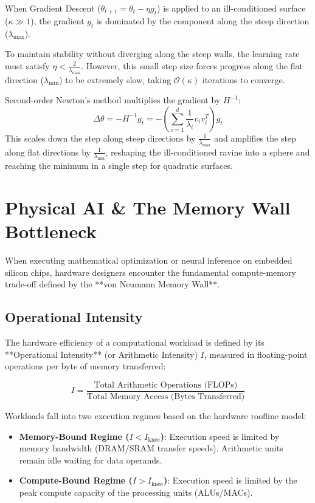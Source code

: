 \begin{mathbox}
When Gradient Descent ($\theta_{t+1} = \theta_t - \eta g_t$) is applied to an ill-conditioned surface ($\kappa \gg 1$), the gradient $g_t$ is dominated by the component along the steep direction ($\lambda_{\max}$). 

To maintain stability without diverging along the steep walls, the learning rate must satisfy $\eta < \frac{2}{\lambda_{\max}}$. However, this small step size forces progress along the flat direction ($\lambda_{\min}$) to be extremely slow, taking $\mathcal{O}(\kappa)$ iterations to converge.

Second-order Newton's method multiplies the gradient by $H^{-1}$:
$$\Delta \theta = -H^{-1} g_t = -\left( \sum_{i=1}^d \frac{1}{\lambda_i} v_i v_i^T \right) g_t$$
This scales down the step along steep directions by $\frac{1}{\lambda_{\max}}$ and amplifies the step along flat directions by $\frac{1}{\lambda_{\min}}$, reshaping the ill-conditioned ravine into a sphere and reaching the minimum in a single step for quadratic surfaces.
\end{mathbox}

\section{Physical AI \& The Memory Wall Bottleneck}
When executing mathematical optimization or neural inference on embedded silicon chips, hardware designers encounter the fundamental compute-memory trade-off defined by the **von Neumann Memory Wall**.

\subsection{Operational Intensity}
The hardware efficiency of a computational workload is defined by its **Operational Intensity** (or Arithmetic Intensity) $I$, measured in floating-point operations per byte of memory transferred:

\begin{equation}
I = \frac{\text{Total Arithmetic Operations (FLOPs)}}{\text{Total Memory Access (Bytes Transferred)}}
\end{equation}

Workloads fall into two execution regimes based on the hardware roofline model:
\begin{itemize}[leftmargin=*]
    \item \textbf{Memory-Bound Regime ($I < I_{\text{knee}}$)}: Execution speed is limited by memory bandwidth (DRAM/SRAM transfer speeds). Arithmetic units remain idle waiting for data operands.
    \item \textbf{Compute-Bound Regime ($I > I_{\text{knee}}$)}: Execution speed is limited by the peak compute capacity of the processing units (ALUs/MACs).
\end{itemize}


